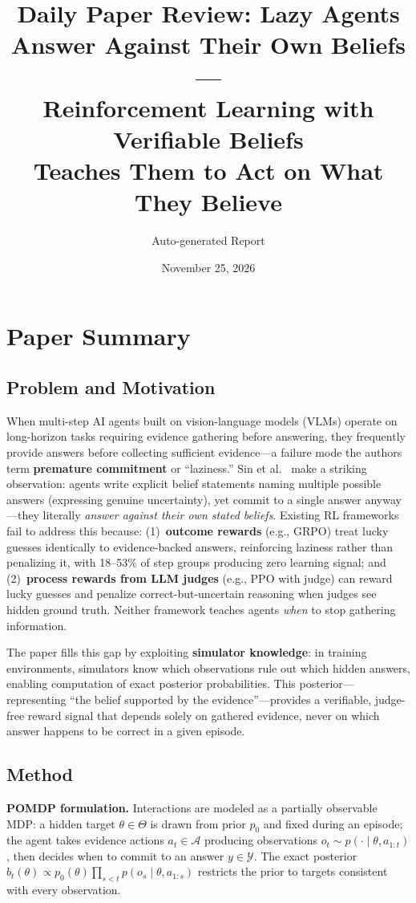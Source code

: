 \documentclass[11pt,a4paper]{article}
\title{Daily Paper Review: Lazy Agents Answer Against Their Own Beliefs ---\\Reinforcement Learning with Verifiable Beliefs\\Teaches Them to Act on What They Believe}
\author{Auto-generated Report}
\date{November 25, 2026}
\begin{document}
\maketitle

\section{Paper Summary}

\subsection{Problem and Motivation}
When multi-step AI agents built on vision-language models (VLMs) operate on long-horizon tasks requiring evidence gathering before answering, they frequently provide answers before collecting sufficient evidence---a failure mode the authors term \textbf{premature commitment} or ``laziness.'' Sin et al.~\cite{sin2026rlvb} make a striking observation: agents write explicit belief statements naming multiple possible answers (expressing genuine uncertainty), yet commit to a single answer anyway---they literally \emph{answer against their own stated beliefs}. Existing RL frameworks fail to address this because: (1)~\textbf{outcome rewards} (e.g., GRPO) treat lucky guesses identically to evidence-backed answers, reinforcing laziness rather than penalizing it, with 18--53\% of step groups producing zero learning signal; and (2)~\textbf{process rewards from LLM judges} (e.g., PPO with judge) can reward lucky guesses and penalize correct-but-uncertain reasoning when judges see hidden ground truth. Neither framework teaches agents \emph{when} to stop gathering information.

The paper fills this gap by exploiting \textbf{simulator knowledge}: in training environments, simulators know which observations rule out which hidden answers, enabling computation of exact posterior probabilities. This posterior---representing ``the belief supported by the evidence''---provides a verifiable, judge-free reward signal that depends solely on gathered evidence, never on which answer happens to be correct in a given episode.

\subsection{Method}
\textbf{POMDP formulation.} Interactions are modeled as a partially observable MDP: a hidden target $\theta \in \Theta$ is drawn from prior $p_0$ and fixed during an episode; the agent takes evidence actions $a_t \in \mathcal{A}$ producing observations $o_t \sim p(\cdot \mid \theta, a_{1:t})$, then decides when to commit to an answer $y \in \mathcal{Y}$. The exact posterior $b_t(\theta) \propto p_0(\theta)\prod_{s<t} p(o_s \mid \theta, a_{1:s})$ restricts the prior to targets consistent with every observation.
\end{document}

